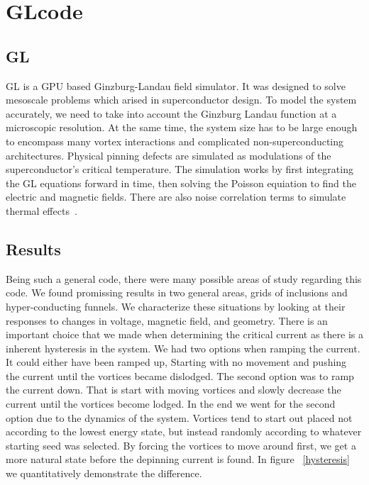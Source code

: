 \chapter{GLcode}          %
\label{codechap}

\section{GL}
GL is a GPU based Ginzburg-Landau field simulator. It was designed to solve mesoscale problems which arised in superconductor design. To model the system accurately, we need to take into account the Ginzburg Landau function at a microscopic resolution. At the same time, the system size has to be large enough to encompass many vortex interactions and complicated non-superconducting architectures. Physical pinning defects are simulated as modulations of the superconductor's critical temperature. The simulation works by first integrating the GL equations forward in time, then solving the Poisson equiation to find the electric and magnetic fields. There are also noise correlation terms to simulate thermal effects~\cite{Sadovskyy14}.

\section{Results}
Being such a general code, there were many possible areas of study regarding this code. We found promissing results in two general areas, grids of inclusions and hyper-conducting funnels. We characterize these situations by looking at their responses to changes in voltage, magnetic field, and geometry. There is an important choice that we made when determining the critical current as there is a inherent hysteresis in the system. We had two options when ramping the current. It could either have been ramped up, Starting with no movement and pushing the current until the vortices became dislodged. The second option was to ramp the current down. That is start with moving vortices and slowly decrease the current until the vortices become lodged. In the end we went for the second option due to the dynamics of the system. Vortices tend to start out placed not according to the lowest energy state, but instead randomly according to whatever starting seed was selected. By forcing the vortices to move around first, we get a more natural state before the depinning current is found. In figure ~\ref{hysteresis} we quantitatively demonstrate the difference.

